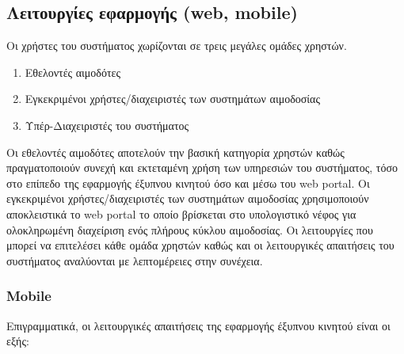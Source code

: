 	\subsection{Λειτουργίες εφαρμογής (web, mobile)}
Οι χρήστες του συστήματος χωρίζονται σε τρεις μεγάλες ομάδες χρηστών.

		\begin{enumerate}

			\item Εθελοντές αιμοδότες
			\item Εγκεκριμένοι χρήστες/διαχειριστές των συστημάτων αιμοδοσίας
			\item Υπέρ-Διαχειριστές του συστήματος

		\end{enumerate}
		
		Οι εθελοντές αιμοδότες αποτελούν την βασική κατηγορία χρηστών καθώς πραγματοποιούν συνεχή και εκτεταμένη χρήση των υπηρεσιών του συστήματος, τόσο στο επίπεδο της εφαρμογής έξυπνου κινητού όσο και μέσω του web portal. Οι εγκεκριμένοι χρήστες/διαχειριστές των συστημάτων αιμοδοσίας χρησιμοποιούν αποκλειστικά το web portal το οποίο βρίσκεται στο υπολογιστικό νέφος για ολοκληρωμένη διαχείριση ενός πλήρους κύκλου αιμοδοσίας. Οι λειτουργίες που μπορεί να επιτελέσει κάθε ομάδα χρηστών καθώς και οι λειτουργικές απαιτήσεις του συστήματος αναλύονται με λεπτομέρειες στην συνέχεια.
		
		\subsubsection{Mobile} \label{sssec:functional_requirements_mobile}
			Επιγραμματικά, οι λειτουργικές απαιτήσεις της εφαρμογής έξυπνου κινητού είναι οι εξής:
			
